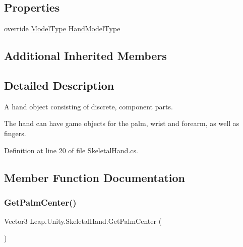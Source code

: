 \subsection*{Properties}
\begin{DoxyCompactItemize}
\item 
override \mbox{\hyperlink{namespace_leap_1_1_unity_a186e5eb0a2b743f1f6b79346f0ab8ad0}{Model\+Type}} \mbox{\hyperlink{class_leap_1_1_unity_1_1_skeletal_hand_a07d04ed397ffe907e83bc487ebaa226e}{Hand\+Model\+Type}}
\end{DoxyCompactItemize}
\subsection*{Additional Inherited Members}


\subsection{Detailed Description}
A hand object consisting of discrete, component parts.

The hand can have game objects for the palm, wrist and forearm, as well as fingers. 

Definition at line 20 of file Skeletal\+Hand.\+cs.



\subsection{Member Function Documentation}
\mbox{\label{class_leap_1_1_unity_1_1_skeletal_hand_aa499e691e131221612553967bbd9cc93}} 
\subsubsection{\texorpdfstring{GetPalmCenter()}{GetPalmCenter()}}
{\footnotesize\ttfamily Vector3 Leap.\+Unity.\+Skeletal\+Hand.\+Get\+Palm\+Center (\begin{DoxyParamCaption}{ }\end{DoxyParamCaption})\hspace{0.3cm}{\ttfamily [protected]}}



